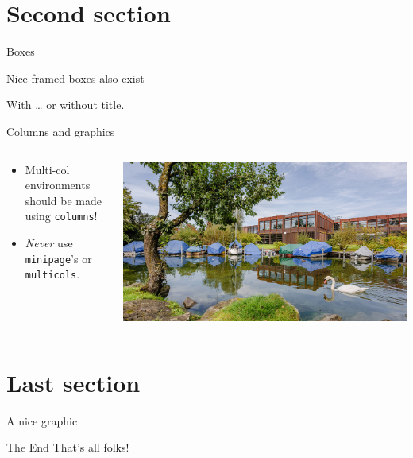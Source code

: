 \documentclass[aspectratio=169]{beamer}    %
\begin{document}
\section{Second section}
\begin{frame}{Boxes}
    \begin{ostbox}{}
        Nice framed boxes also exist
    \end{ostbox}
    \begin{ostbox}{With \dots}
        or without title.
    \end{ostbox}
\end{frame}
\begin{frame}{Columns and graphics}
    \begin{columns}[onlytextwidth]
        \begin{column}{0.5\textwidth}
            \begin{itemize}
                \item Multi-col environments should be made using \texttt{columns}!
                \item \emph{Never} use \texttt{minipage}'s or \texttt{multicols}.
            \end{itemize}
        \end{column}
        \begin{column}{0.5\textwidth}
            \centering
            \includegraphics[width=0.8\linewidth]{backgrounds/title_rapperswil_bar}
        \end{column}
    \end{columns}
\end{frame}

\section{Last section}
\begin{frame}{A nice graphic}
    \centering
    
\end{frame}
\begin{frame}{The End}
    \centering
    \LARGE That's all folks!
\end{frame}
\end{document}
